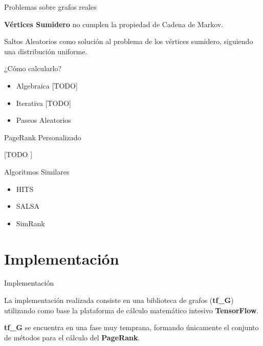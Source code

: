 \documentclass[12pt]{beamer}
\begin{document}
    \begin{frame}[fragile]{Problemas sobre grafos reales}

      \textbf{Vértices Sumidero} no cumplen la propiedad de Cadena de Markov.

      Saltos Aleatorios como solución al problema de los vértices sumidero, siguiendo una distribución uniforme.

    \end{frame}

    \begin{frame}[fragile]{¿Cómo calcularlo?}

      \begin{itemize}
        \item Algebraica [TODO]
        \item Iterativa [TODO]
        \item Paseos Aleatorios
      \end{itemize}

    \end{frame}

    \begin{frame}[fragile]{PageRank Personalizado}

      [TODO ]

    \end{frame}

    \begin{frame}[fragile]{Algoritmos Similares}

      \begin{itemize}
        \item HITS
        \item SALSA
        \item SimRank
      \end{itemize}

    \end{frame}

  \section{Implementación}


    \begin{frame}[fragile]{Implementación}

      La implementación realizada consiste en una biblioteca de grafos (\textbf{tf\_G}) utilizando como base la plataforma de cálculo matemático intesivo \textbf{TensorFlow}.

      \textbf{tf\_G} se encuentra en una fase muy temprana, formando únicamente el conjunto de métodos para el cálculo del \textbf{PageRank}.

    \end{frame}
\end{document}
